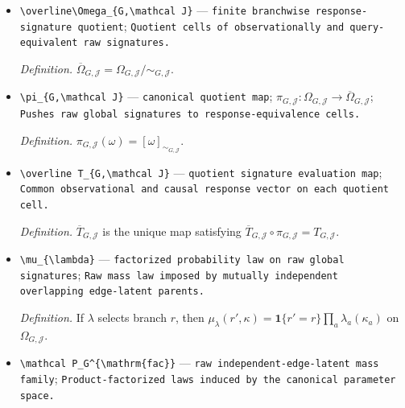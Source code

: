 \documentclass{article}
\begin{document}
\begin{itemize}
  \par\smallskip\noindent\emph{Definition.} For \(\omega=(r,\kappa)\) and \(\omega'=(r',\kappa')\), \(\omega\sim_{G,\mathcal J}\omega'\) exactly when \(r=r'\) and \(T_{G,\mathcal J}(\omega)=T_{G,\mathcal J}(\omega')\).
  \item \texttt{\textbackslash{}\allowbreak{}overline\textbackslash{}\allowbreak{}Omega\_\allowbreak{}\{G,\allowbreak{}\textbackslash{}\allowbreak{}mathcal J\}\allowbreak{}} --- \texttt{finite branchwise response-\allowbreak{}signature quotient}; \texttt{Quotient cells of observationally and query-\allowbreak{}equivalent raw signatures.}
  \par\smallskip\noindent\emph{Definition.} \(\overline\Omega_{G,\mathcal J}=\Omega_{G,\mathcal J}/\!\sim_{G,\mathcal J}\).
  \item \texttt{\textbackslash{}\allowbreak{}pi\_\allowbreak{}\{G,\allowbreak{}\textbackslash{}\allowbreak{}mathcal J\}\allowbreak{}} --- \texttt{canonical quotient map}; \(\pi_{G,\mathcal J}:\Omega_{G,\mathcal J}\to\overline\Omega_{G,\mathcal J}\); \texttt{Pushes raw global signatures to response-\allowbreak{}equivalence cells.}
  \par\smallskip\noindent\emph{Definition.} \(\pi_{G,\mathcal J}(\omega)=[\omega]_{\sim_{G,\mathcal J}}\).
  \item \texttt{\textbackslash{}\allowbreak{}overline T\_\allowbreak{}\{G,\allowbreak{}\textbackslash{}\allowbreak{}mathcal J\}\allowbreak{}} --- \texttt{quotient signature evaluation map}; \texttt{Common observational and causal response vector on each quotient cell.}
  \par\smallskip\noindent\emph{Definition.} \(\overline T_{G,\mathcal J}\) is the unique map satisfying \(\overline T_{G,\mathcal J}\circ\pi_{G,\mathcal J}=T_{G,\mathcal J}\).
  \item \texttt{\textbackslash{}\allowbreak{}mu\_\allowbreak{}\{\textbackslash{}\allowbreak{}lambda\}\allowbreak{}} --- \texttt{factorized probability law on raw global signatures}; \texttt{Raw mass law imposed by mutually independent overlapping edge-\allowbreak{}latent parents.}
  \par\smallskip\noindent\emph{Definition.} If \(\lambda\) selects branch \(r\), then \(\mu_{\lambda}(r',\kappa)=\mathbf 1\{r'=r\}\prod_a\lambda_a(\kappa_a)\) on \(\Omega_{G,\mathcal J}\).
  \item \texttt{\textbackslash{}\allowbreak{}mathcal P\_\allowbreak{}G\textasciicircum{}\{\textbackslash{}\allowbreak{}mathrm\{fac\}\allowbreak{}\}\allowbreak{}} --- \texttt{raw independent-\allowbreak{}edge-\allowbreak{}latent mass family}; \texttt{Product-\allowbreak{}factorized laws induced by the canonical parameter space.}

\end{itemize}
\end{document}
